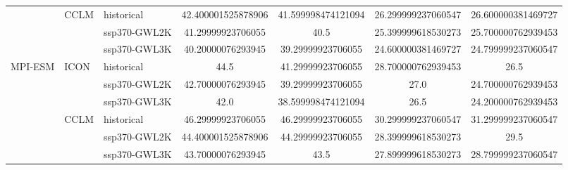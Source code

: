 \begin{table}[!htbp]
\begin{tabular}{lll|cc|cc}
\cmidrule(lr){2-7}
 & \multirow{3}{*}{CCLM} & historical & 42.400001525878906 & 41.599998474121094 & 26.299999237060547 & 26.600000381469727 \\
 &  & ssp370-GWL2K & 41.29999923706055 & 40.5 & 25.399999618530273 & 25.700000762939453 \\
 &  & ssp370-GWL3K & 40.20000076293945 & 39.29999923706055 & 24.600000381469727 & 24.799999237060547 \\
\cmidrule(lr){2-7}
\multirow{6}{*}{MPI-ESM} & \multirow{3}{*}{ICON} & historical & 44.5 & 41.29999923706055 & 28.700000762939453 & 26.5 \\
 &  & ssp370-GWL2K & 42.70000076293945 & 39.29999923706055 & 27.0 & 24.700000762939453 \\
 &  & ssp370-GWL3K & 42.0 & 38.599998474121094 & 26.5 & 24.200000762939453 \\
\cmidrule(lr){2-7}
 & \multirow{3}{*}{CCLM} & historical & 46.29999923706055 & 46.29999923706055 & 30.299999237060547 & 31.299999237060547 \\
 &  & ssp370-GWL2K & 44.400001525878906 & 44.29999923706055 & 28.399999618530273 & 29.5 \\
 &  & ssp370-GWL3K & 43.70000076293945 & 43.5 & 27.899999618530273 & 28.799999237060547 \\
\bottomrule
\end{tabular}
\end{table}

